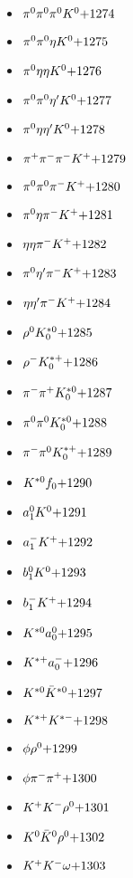 \begin{multicols}{3}
\begin{itemize}
 \item $ \pi^{0} \pi^{0} \pi^{0} K^{0} \hfill{+1274}$
 \item $ \pi^{0} \pi^{0} \eta K^{0} \hfill{+1275}$
 \item $ \pi^{0} \eta \eta K^{0} \hfill{+1276}$
 \item $ \pi^{0} \pi^{0} {\eta^{\prime}} K^{0} \hfill{+1277}$
 \item $ \pi^{0} \eta {\eta^{\prime}} K^{0} \hfill{+1278}$
 \item $ \pi^{+} \pi^{-} \pi^{-} K^{+} \hfill{+1279}$
 \item $ \pi^{0} \pi^{0} \pi^{-} K^{+} \hfill{+1280}$
 \item $ \pi^{0} \eta \pi^{-} K^{+} \hfill{+1281}$
 \item $ \eta \eta \pi^{-} K^{+} \hfill{+1282}$
 \item $ \pi^{0} {\eta^{\prime}} \pi^{-} K^{+} \hfill{+1283}$
 \item $ \eta {\eta^{\prime}} \pi^{-} K^{+} \hfill{+1284}$
 \item $ \rho^{0} K_{0}^{*0} \hfill{+1285}$
 \item $ \rho^{-} K_{0}^{*+} \hfill{+1286}$
 \item $ \pi^{-} \pi^{+} K_{0}^{*0} \hfill{+1287}$
 \item $ \pi^{0} \pi^{0} K_{0}^{*0} \hfill{+1288}$
 \item $ \pi^{-} \pi^{0} K_{0}^{*+} \hfill{+1289}$
 \item $ K^{*0} f_{0} \hfill{+1290}$
 \item $ a_{1}^{0} K^{0} \hfill{+1291}$
 \item $ a_{1}^{-} K^{+} \hfill{+1292}$
 \item $ b_{1}^{0} K^{0} \hfill{+1293}$
 \item $ b_{1}^{-} K^{+} \hfill{+1294}$
 \item $ K^{*0} a_{0}^{0} \hfill{+1295}$
 \item $ K^{*+} a_{0}^{-} \hfill{+1296}$
 \item $ K^{*0} \bar{K}^{*0} \hfill{+1297}$
 \item $ K^{*+} K^{*-} \hfill{+1298}$
 \item $ \phi \rho^{0} \hfill{+1299}$
 \item $ \phi \pi^{-} \pi^{+} \hfill{+1300}$
 \item $ K^{+} K^{-} \rho^{0} \hfill{+1301}$
 \item $ K^{0} \bar{K}^{0} \rho^{0} \hfill{+1302}$
 \item $ K^{+} K^{-} \omega \hfill{+1303}$

\end{itemize}
\end{multicols}
